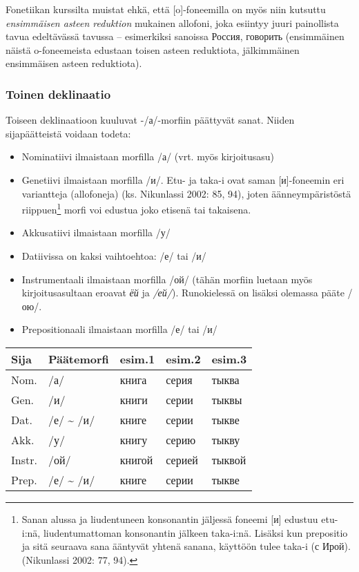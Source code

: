\documentclass[]{scrartcl}
\providecommand{\tightlist}{%
  \setlength{\itemsep}{0pt}\setlength{\parskip}{0pt}}
\begin{document}
Fonetiikan kurssilta muistat ehkä, että {[}o{]}-foneemilla on myös niin
kutsuttu \emph{ensimmäisen asteen reduktion} mukainen allofoni, joka
esiintyy juuri painollista tavua edeltävässä tavussa -- esimerkiksi
sanoissa Россия, говорить (ensimmäinen näistä o-foneemeista edustaan
toisen asteen reduktiota, jälkimmäinen ensimmäisen asteen reduktiota).

\subsubsection{Toinen deklinaatio}\label{toinen-deklinaatio}

Toiseen deklinaatioon kuuluvat -/а/-morfiin päättyvät sanat. Niiden
sijapäätteistä voidaan todeta:

\begin{itemize}
\tightlist
\item
  Nominatiivi ilmaistaan morfilla /а/ (vrt. myös kirjoitusasu)
\item
  Genetiivi ilmaistaan morfilla /и/. Etu- ja taka-i ovat saman
  {[}и{]}-foneemin eri variantteja (allofoneja) (ks. Nikunlassi 2002:
  85, 94), joten äänneympäristöstä riippuen\footnote{Sanan alussa ja
    liudentuneen konsonantin jäljessä foneemi {[}и{]} edustuu etu-i:nä,
    liudentumattoman konsonantin jälkeen taka-i:nä. Lisäksi kun
    prepositio ja sitä seuraava sana ääntyvät yhtenä sanana, käyttöön
    tulee taka-i (с Ирой). (Nikunlassi 2002: 77, 94).} morfi voi edustua
  joko etisenä tai takaisena.
\item
  Akkusatiivi ilmaistaan morfilla /у/
\item
  Datiivissa on kaksi vaihtoehtoa: /е/ tai /и/
\item
  Instrumentaali ilmaistaan morfilla /ой/ (tähän morfiin luetaan myös
  kirjoitusasultaan eroavat \emph{ёй} ja \emph{/ей/}). Runokielessä on lisäksi olemassa pääte
  /ою/.
\item
  Prepositionaali ilmaistaan morfilla /е/ tai /и/
\end{itemize}

\begin{longtable}[c]{@{}lllll@{}}
\toprule
Sija & Päätemorfi & esim.1 & esim.2 & esim.3\tabularnewline
\midrule
\endhead
Nom. & /а/ & книга & серия & тыква\tabularnewline
Gen. & /и/ & книги & серии & тыквы\tabularnewline
Dat. & /е/ \textasciitilde{} /и/ & книге & серии & тыкве\tabularnewline
Akk. & /у/ & книгу & серию & тыкву\tabularnewline
Instr. & /ой/ & книгой & серией &
тыквой\tabularnewline
Prep. & /е/ \textasciitilde{} /и/ & книге & серии & тыкве\tabularnewline
\bottomrule
\end{longtable}
\end{document}
